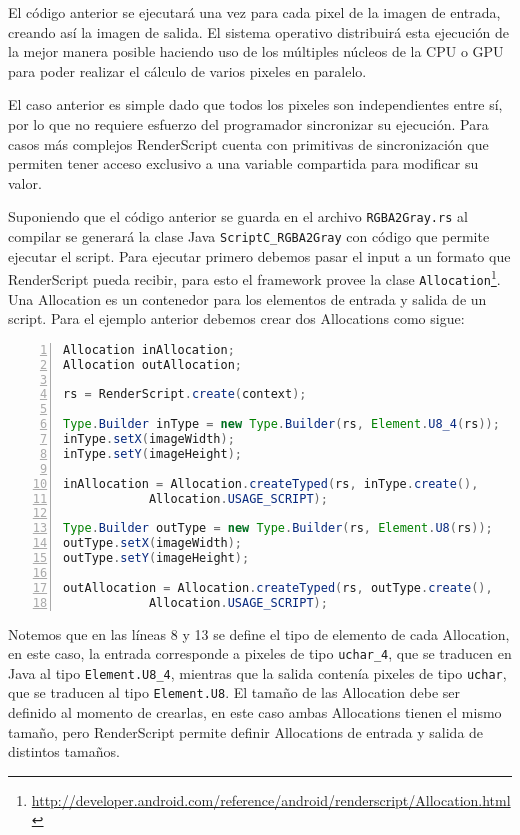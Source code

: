 El código anterior se ejecutará una vez para cada pixel de la imagen de entrada, creando así la imagen de salida. El sistema operativo distribuirá esta ejecución de la mejor manera posible haciendo uso de los múltiples núcleos de la CPU o GPU para poder realizar el cálculo de varios pixeles en paralelo.

El caso anterior es simple dado que todos los pixeles son independientes entre sí, por lo que no requiere esfuerzo del programador sincronizar su ejecución. Para casos más complejos RenderScript cuenta con primitivas de sincronización que permiten tener acceso exclusivo a una variable compartida para modificar su valor.

Suponiendo que el código anterior se guarda en el archivo \texttt{RGBA2Gray.rs} al compilar se generará la clase Java
\texttt{ScriptC\_RGBA2Gray} con código que permite ejecutar el script. Para ejecutar primero debemos pasar el input a un formato que RenderScript pueda recibir, para esto el framework provee la clase \texttt{Allocation}\footnote{\url{http://developer.android.com/reference/android/renderscript/Allocation.html}}. Una Allocation es un contenedor para los elementos de entrada y salida de un script. Para el ejemplo anterior debemos crear dos Allocations como sigue:

\begin{lstlisting}[language=Java, frame=bt, numbers=left]
Allocation inAllocation;
Allocation outAllocation;

rs = RenderScript.create(context);

Type.Builder inType = new Type.Builder(rs, Element.U8_4(rs));
inType.setX(imageWidth);
inType.setY(imageHeight);

inAllocation = Allocation.createTyped(rs, inType.create(),
            Allocation.USAGE_SCRIPT);

Type.Builder outType = new Type.Builder(rs, Element.U8(rs));
outType.setX(imageWidth);
outType.setY(imageHeight);

outAllocation = Allocation.createTyped(rs, outType.create(),
            Allocation.USAGE_SCRIPT);
\end{lstlisting}

Notemos que en las líneas 8 y 13 se define el tipo de elemento de cada Allocation, en este caso, la entrada corresponde a pixeles de tipo \texttt{uchar\_4}, que se traducen en Java al tipo \texttt{Element.U8\_4}, mientras que la salida contenía pixeles de tipo \texttt{uchar}, que se traducen al tipo \texttt{Element.U8}. El tamaño de las Allocation debe ser definido al momento de crearlas, en este caso ambas Allocations tienen el mismo tamaño, pero RenderScript permite definir Allocations de entrada y salida de distintos tamaños.

